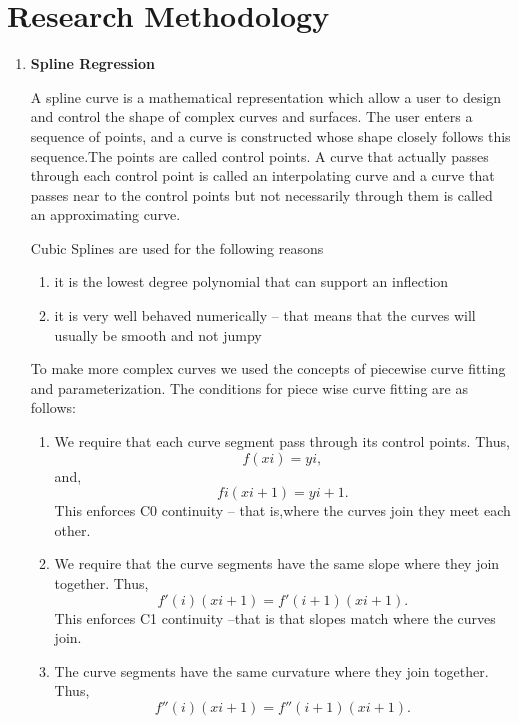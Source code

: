 \documentclass[a4paper,12pt]{article}
\begin{document}
\section{\fontsize{16pt}{1em} Research Methodology}
\begin{enumerate}
\item
\textbf{Spline Regression}

A spline curve is a mathematical representation which allow a user to design and control the shape of complex curves and surfaces. The user enters a sequence of points, and a curve is constructed whose shape closely follows this sequence.The points are called control points. A curve that actually passes through each control point is called an interpolating curve and a curve that passes near to the
control points but not necessarily through them is called an approximating curve.


Cubic Splines are used for the following reasons
\begin{enumerate}
\item it is the lowest degree polynomial that can support an inflection
\item it is very well behaved numerically – that means that the curves will
usually be smooth and not jumpy

\end{enumerate}

To make more complex curves we used the concepts of piecewise curve fitting and parameterization. The conditions for piece wise curve fitting are as follows:

\begin{enumerate}
\item We require that each curve segment pass through its control points. Thus,
\begin{equation}
f(xi) = yi,
\end{equation}
 and,
 \begin{equation}
 fi(xi+1) = yi+1.
 \end{equation}
  This enforces C0 continuity – that is,where the curves join they meet each other.
\item We require that the curve segments have the same slope where they join
together. Thus, 
\begin{equation}
f'(i)(xi+1) = f'(i+1)(xi+1).
\end{equation} This enforces C1 continuity –that is that slopes match where the curves join.
\item The curve segments have the same curvature where they join together. Thus, 
\begin{equation}
f''(i)(xi+1) = f''(i+1)(xi+1).
\end{equation}


\end{enumerate}
\end{enumerate}
\end{document}
